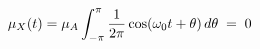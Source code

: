 \documentclass[preview]{standalone}
\begin{document}
\begin{align*}
\special{dvisvgm:raw <g id='unique000'>}\mu_X(t)=\mu_A\int_{-\pi}^{\pi}\frac{1}{2\pi}\cos(\omega_0 t+\theta)\,d\theta \;=\; 0\special{dvisvgm:raw </g>}
\end{align*}
\end{document}
